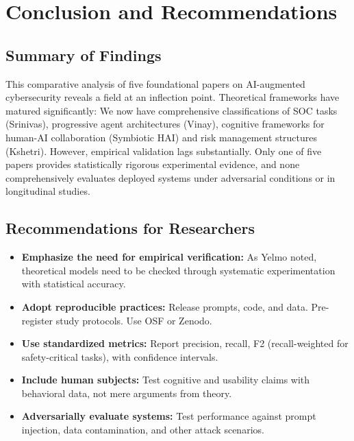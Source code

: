 \documentclass[journal]{IEEEtran}
\begin{document}
\section{Conclusion and Recommendations}

\subsection{Summary of Findings}
This comparative analysis of five foundational papers on AI-augmented cybersecurity reveals a field at an inflection point. Theoretical frameworks have matured significantly: We now have comprehensive classifications of SOC tasks (Srinivas), progressive agent architectures (Vinay), cognitive frameworks for human-AI collaboration (Symbiotic HAI) and risk management structures (Kshetri). However, empirical validation lags substantially. Only one of five papers provides statistically rigorous experimental evidence, and none comprehensively evaluates deployed systems under adversarial conditions or in longitudinal studies.

\subsection{Recommendations for Researchers}
\begin{itemize}
    \item \textbf{Emphasize the need for empirical verification:} As Yelmo noted, theoretical models need to be checked through systematic experimentation with statistical accuracy.
    \item \textbf{Adopt reproducible practices:} Release prompts, code, and data. Pre-register study protocols. Use OSF or Zenodo.
    \item \textbf{Use standardized metrics:} Report precision, recall, F2 (recall-weighted for safety-critical tasks), with confidence intervals.
    \item \textbf{Include human subjects:} Test cognitive and usability claims with behavioral data, not mere arguments from theory.
    \item \textbf{Adversarially evaluate systems:} Test performance against prompt injection, data contamination, and other attack scenarios.
\end{itemize}
\end{document}
